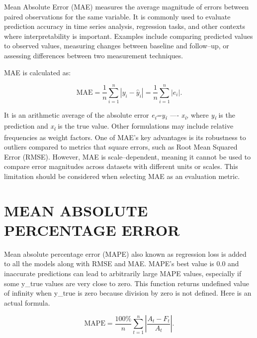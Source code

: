 \documentclass[12pt,a4paper]{report}
\numberwithin{equation}{section}
\begin{document}
Mean Absolute Error (MAE) \cite{willmott2005advantages_74} measures the average magnitude of
errors between paired observations for the same variable. It is commonly
used to evaluate prediction accuracy in time series analysis, regression
tasks, and other contexts where interpretability is important. Examples
include comparing predicted values to observed values, measuring changes
between baseline and follow--up, or assessing differences between two
measurement techniques.

MAE is calculated as:

\begin{equation}\label{eq:4.1.7}
\mathrm{MAE}
= \frac{1}{n}\sum_{i=1}^{n}\left|y_i-\widehat{y}_i\right|
= \frac{1}{n}\sum_{i=1}^{n}\left|e_i\right|.
\end{equation}


It is an arithmetic average of the absolute error
\emph{\textbar e\textsubscript{i}\textbar=\textbar y\textsubscript{i} ----
x\textsubscript{i}\textbar,} where \emph{y\textsubscript{i}} is the
prediction and \emph{x\textsubscript{i}} is the true value. Other
formulations may include relative frequencies as weight factors. One of
MAE's key advantages is its robustness to outliers compared to metrics
that square errors, such as Root Mean Squared Error (RMSE). However, MAE
is scale--dependent, meaning it cannot be used to compare error
magnitudes across datasets with different units or scales. This
limitation should be considered when selecting MAE as an evaluation
metric.

\hypertarget{mean--absolute--percentage--error}{%
\section{\texorpdfstring{\textbf{MEAN ABSOLUTE PERCENTAGE
ERROR}}{MEAN ABSOLUTE PERCENTAGE ERROR}}\label{mean--absolute--percentage--error}}

Mean absolute percentage error (MAPE) also known as regression loss is
added to all the models along with RMSE and MAE. MAPE's best value is
0.0 and inaccurate predictions can lead to arbitrarily large MAPE
values, especially if some y\_true values are very close to zero. This
function returns undefined value of infinity when y\_true is zero
because division by zero is not defined. Here is an actual formula.

\begin{equation}\label{eq:4.1.8}
\mathrm{MAPE}
= \frac{100\%}{n}\sum_{t=1}^{n}\left|\frac{A_t - F_t}{A_t}\right|.
\end{equation}
\end{document}
